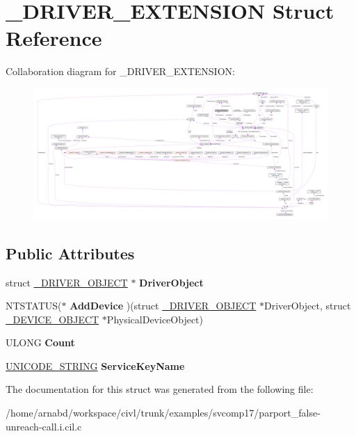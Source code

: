 \hypertarget{struct__DRIVER__EXTENSION}{}\section{\+\_\+\+D\+R\+I\+V\+E\+R\+\_\+\+E\+X\+T\+E\+N\+S\+I\+O\+N Struct Reference}
\label{struct__DRIVER__EXTENSION}


Collaboration diagram for \+\_\+\+D\+R\+I\+V\+E\+R\+\_\+\+E\+X\+T\+E\+N\+S\+I\+O\+N\+:
\nopagebreak
\begin{figure}[H]
\begin{center}
\leavevmode
\includegraphics[width=350pt]{struct__DRIVER__EXTENSION__coll__graph}
\end{center}
\end{figure}
\subsection*{Public Attributes}
\begin{DoxyCompactItemize}
\item 
\hypertarget{struct__DRIVER__EXTENSION_a65f6fe4eb8f99cb9c26c9fc38ad71d03}{}struct \hyperlink{struct__DRIVER__OBJECT}{\+\_\+\+D\+R\+I\+V\+E\+R\+\_\+\+O\+B\+J\+E\+C\+T} $\ast$ {\bfseries Driver\+Object}\label{struct__DRIVER__EXTENSION_a65f6fe4eb8f99cb9c26c9fc38ad71d03}

\item 
\hypertarget{struct__DRIVER__EXTENSION_a114855e7d85cfd37aeb6b02d4f168db8}{}N\+T\+S\+T\+A\+T\+U\+S($\ast$ {\bfseries Add\+Device} )(struct \hyperlink{struct__DRIVER__OBJECT}{\+\_\+\+D\+R\+I\+V\+E\+R\+\_\+\+O\+B\+J\+E\+C\+T} $\ast$Driver\+Object, struct \hyperlink{struct__DEVICE__OBJECT}{\+\_\+\+D\+E\+V\+I\+C\+E\+\_\+\+O\+B\+J\+E\+C\+T} $\ast$Physical\+Device\+Object)\label{struct__DRIVER__EXTENSION_a114855e7d85cfd37aeb6b02d4f168db8}

\item 
\hypertarget{struct__DRIVER__EXTENSION_ad538c293521ec3d6b4fb739d271fde1d}{}U\+L\+O\+N\+G {\bfseries Count}\label{struct__DRIVER__EXTENSION_ad538c293521ec3d6b4fb739d271fde1d}

\item 
\hypertarget{struct__DRIVER__EXTENSION_aa3a6f76b67b89a18d60f16a980b1515f}{}\hyperlink{struct__UNICODE__STRING}{U\+N\+I\+C\+O\+D\+E\+\_\+\+S\+T\+R\+I\+N\+G} {\bfseries Service\+Key\+Name}\label{struct__DRIVER__EXTENSION_aa3a6f76b67b89a18d60f16a980b1515f}

\end{DoxyCompactItemize}


The documentation for this struct was generated from the following file\+:\begin{DoxyCompactItemize}
\item 
/home/arnabd/workspace/civl/trunk/examples/svcomp17/parport\+\_\+false-\/unreach-\/call.\+i.\+cil.\+c\end{DoxyCompactItemize}

